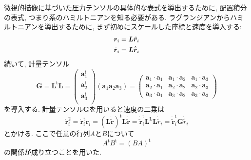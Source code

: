 微視的描像に基づいた圧力テンソルの具体的な表式を導出するために, 配置積分の表式, つまり系のハミルトニアンを知る必要がある. 
ラグランジアンからハミルトニアンを導出するために, まず初めにスケールした座標と速度を導入する:
\begin{align}
  \bm{r}_{i} &= \bm{L} \tilde{\bm{r}}_{i}
  \\ \notag
  \dot{\bm{r}}_{i} &= \bm{L} \dot{\tilde{\bm{r}}}_{i}
\end{align}
続いて, 計量テンソル
\begin{equation}
  \bm{G}
  =
  \bm{L}^{\mathrm{t}} \bm{L}
  =
  \left(
       \begin{array}{c}
        \bm{a}_{1}^{\mathrm{t}}  \\
        \bm{a}_{2}^{\mathrm{t}}  \\
        \bm{a}_{3}^{\mathrm{t}}  \\
       \end{array}
  \right)
  \left(\bm{a}_{1} \bm{a}_{2} \bm{a}_{3}\right)
  =
  \left(
       \begin{array}{ccc}
          \bm{a}_{1}\cdot\bm{a}_{1}
        & \bm{a}_{1}\cdot\bm{a}_{2}
        & \bm{a}_{1}\cdot\bm{a}_{3} \\
          \bm{a}_{2}\cdot\bm{a}_{1}
        & \bm{a}_{2}\cdot\bm{a}_{2}
        & \bm{a}_{2}\cdot\bm{a}_{3} \\
          \bm{a}_{3}\cdot\bm{a}_{1}
        & \bm{a}_{3}\cdot\bm{a}_{2}
        & \bm{a}_{3}\cdot\bm{a}_{3}
       \end{array}
  \right)
\end{equation}
を導入する. 計量テンソル$\bm{G}$を用いると速度の二乗は
\begin{equation}
  \dot{\bm{r}}_{i}^{2}
  =
  \dot{\bm{r}}_{i}^{\mathrm{t}} \dot{\bm{r}}_{i}
  =
  \left(\bm{L} \dot{\tilde{\bm{r}}} \right)^{\mathrm{t}} \bm{L} \dot{\tilde{\bm{r}}}
  =
  \dot{\tilde{\bm{r}}}_{i}^{\mathrm{t}} \bm{L}^{\mathrm{L}} \bm{L} \dot{\tilde{r}}_{i}
  =
  \dot{\tilde{\bm{r}}}_{i}^{\mathrm{t}} \bm{G} \dot{\tilde{r}}_{i}
\end{equation}
とかける. ここで任意の行列$A$と$B$について
\begin{equation}
  A^{\mathrm{t}} B^{\mathrm{t}} = (BA)^{\mathrm{t}}
\end{equation}
の関係が成り立つことを用いた. 

